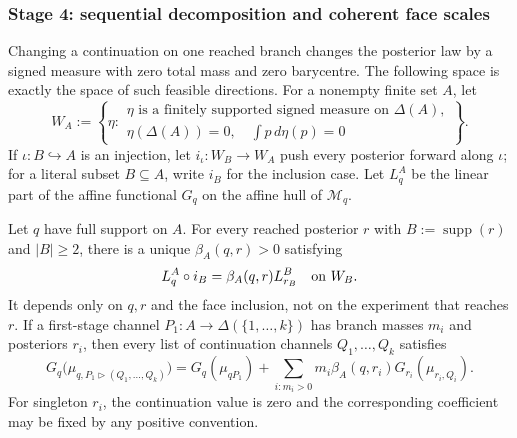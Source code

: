 \subsubsection{Stage 4: sequential decomposition and coherent face scales}

Changing a continuation on one reached branch changes the posterior law by a
signed measure with zero total mass and zero barycentre.  The following space
is exactly the space of such feasible directions.
For a nonempty finite set $A$, let
\[
 W_A:=\left\{\eta:
 \begin{array}{l}
 \eta\text{ is a finitely supported signed measure on }\Delta(A),\\[-2pt]
 \eta(\Delta(A))=0,\quad \displaystyle\int p\,d\eta(p)=0
 \end{array}\right\}.
\]
If $\iota:B\hookrightarrow A$ is an injection, let
$i_\iota:W_B\to W_A$ push every posterior forward along $\iota$; for a
literal subset $B\subseteq A$, write $i_B$ for the inclusion case.  Let
$L_q^A$ be the linear part of the affine functional $G_q$ on the affine hull
of $\mathcal M_q$.

\begin{lemma}
\label{pt:lem:branchagg}
Let $q$ have full support on $A$.  For every reached posterior $r$ with
$B:=\operatorname{supp}(r)$ and $|B|\ge2$, there is a unique
$\beta_A(q,r)>0$ satisfying
\begin{equation}
 L_q^A\circ i_B=\beta_A(q,r)L_{r_B}^B
 \quad\hbox{on }W_B.
\label{pt:eq:branch-linear}
\end{equation}
It depends only on $q,r$ and the face inclusion, not on the experiment that
reaches $r$.  If a first-stage channel $P_1:A\to\Delta(\{1,\ldots,k\})$ has branch masses
$m_i$ and posteriors $r_i$, then every list of continuation channels $Q_1,\ldots,Q_k$ satisfies
\begin{equation}
 G_q\bigl(\mu_{q,P_1\triangleright(Q_1,\ldots,Q_k)}\bigr)
 =G_q(\mu_{qP_1})+
 \sum_{i:m_i>0}m_i\beta_A(q,r_i)
 G_{r_i}(\mu_{r_i,Q_i}).
\tag{BA}\label{pt:eq:branchaggregation}
\end{equation}
For singleton $r_i$, the continuation value is zero and the corresponding
coefficient may be fixed by any positive convention.
\end{lemma}

